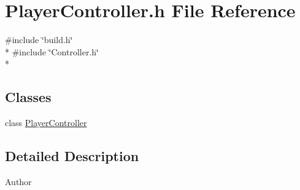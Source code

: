 \section{Player\-Controller.\-h File Reference}
\label{_player_controller_8h}
{\ttfamily \#include \char`\"{}build.\-h\char`\"{}}\\*
{\ttfamily \#include \char`\"{}Controller.\-h\char`\"{}}\\*
\subsection*{Classes}
\begin{DoxyCompactItemize}
\item 
class \hyperlink{class_player_controller}{Player\-Controller}
\end{DoxyCompactItemize}


\subsection{Detailed Description}
\begin{DoxyAuthor}{Author}

\end{DoxyAuthor}
